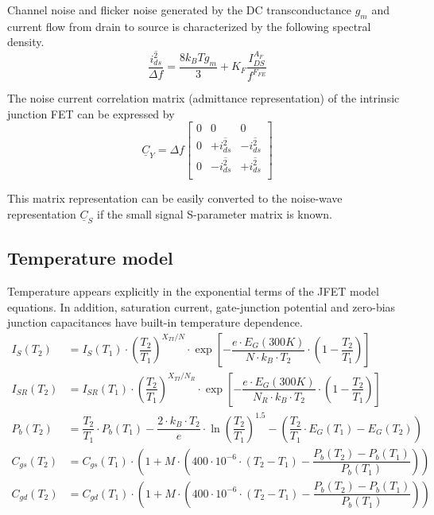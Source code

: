Channel noise and flicker noise generated by the DC transconductance
$g_m$ and current flow from drain to source is characterized by the
following spectral density.
\begin{equation}
\dfrac{\overline{i_{ds}^2}}{\Delta f} = \dfrac{8 k_B T g_m}{3} + K_F\dfrac{I_{DS}^{A_F}}{f^{F_{FE}}}
\end{equation}

The noise current correlation matrix (admittance representation) of
the intrinsic junction FET can be expressed by
\begin{equation}
\underline{C}_Y = \Delta f
\begin{bmatrix}
0 & 0 & 0\\
0 & +\overline{i_{ds}^2} & -\overline{i_{ds}^2}\\
0 & -\overline{i_{ds}^2} & +\overline{i_{ds}^2}\\
\end{bmatrix}
\end{equation}

This matrix representation can be easily converted to the noise-wave
representation $\underline{C}_S$ if the small signal S-parameter
matrix is known.

\subsection{Temperature model}

Temperature appears explicitly in the exponential terms of the JFET
model equations.  In addition, saturation current, gate-junction
potential and zero-bias junction capacitances have built-in
temperature dependence.
\begin{align}
I_S\left(T_2\right) &= I_S\left(T_1\right)\cdot \left(\dfrac{T_2}{T_1}\right)^{X_{TI} / N} \cdot \exp{\left[-\dfrac{e\cdot E_G\left(300K\right)}{N\cdot k_B\cdot T_2}\cdot \left(1 - \dfrac{T_2}{T_1}\right)\right]}\\
I_{SR}\left(T_2\right) &= I_{SR}\left(T_1\right)\cdot \left(\dfrac{T_2}{T_1}\right)^{X_{TI} / N_R} \cdot \exp{\left[-\dfrac{e\cdot E_G\left(300K\right)}{N_R\cdot k_B\cdot T_2}\cdot \left(1 - \dfrac{T_2}{T_1}\right)\right]}\\
P_{b}\left(T_2\right)  &= \dfrac{T_2}{T_1}\cdot P_{b}\left(T_1\right) - \dfrac{2\cdot k_B\cdot T_2}{e} \cdot \ln{\left(\dfrac{T_2}{T_1}\right)^{1.5}} - \left(\dfrac{T_2}{T_1} \cdot E_G\left(T_1\right) - E_G\left(T_2\right)\right)\\
C_{gs}\left(T_2\right) &= C_{gs}\left(T_1\right)\cdot\left(1 + M\cdot\left(400\cdot 10^{-6} \cdot\left(T_2 - T_1\right) - \dfrac{P_{b}\left(T_2\right) - P_{b}\left(T_1\right)}{P_{b}\left(T_1\right)}\right)\right)\\
C_{gd}\left(T_2\right) &= C_{gd}\left(T_1\right)\cdot\left(1 + M\cdot\left(400\cdot 10^{-6} \cdot\left(T_2 - T_1\right) - \dfrac{P_{b}\left(T_2\right) - P_{b}\left(T_1\right)}{P_{b}\left(T_1\right)}\right)\right)
\end{align}

